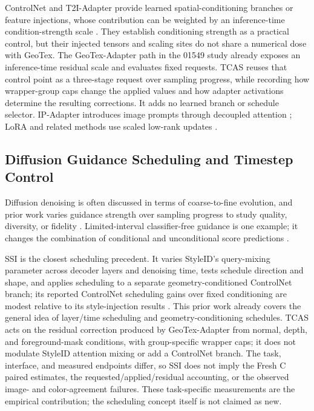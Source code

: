 \documentclass[times,twocolumn,final]{elsarticle}
\providecommand{\DIFadd}[1]{{\protect\color{blue} \sf #1}} %
\providecommand{\DIFaddbegin}{} %
\providecommand{\DIFaddend}{} %
\begin{document}
  \DIFaddbegin \DIFadd{ControlNet and }\DIFaddend T2I-Adapter   \DIFaddbegin \DIFadd{provide learned spatial-conditioning branches or feature injections, whose contribution can be weighted by an inference-time condition-strength scale \cite{mou2023t2iadapter,zhang2023controlnet}. They establish conditioning strength as a practical control, but their injected tensors and scaling sites do not share a numerical dose with GeoTex. The GeoTex-Adapter path in the 01549 study already exposes an inference-time residual scale and evaluates fixed requests. TCAS reuses that control point as a three-stage request over sampling progress, while recording how wrapper-group caps change the applied values and how adapter activations determine the resulting corrections. It adds no learned branch or schedule selector}\DIFaddend . IP-Adapter introduces image prompts through decoupled attention \cite{ye2023ipadapter}  \DIFaddbegin \DIFadd{; LoRA and related methods use scaled }\DIFaddend low-rank   updates \cite{hu2022lora,liu2024dora,zhang2023adalora}.
 
 

\subsection{Diffusion Guidance Scheduling and Timestep Control}
\label{subsec:guidance}

  \DIFaddbegin \DIFadd{Diffusion denoising is often discussed in terms of coarse-to-fine evolution, and prior work varies guidance strength over sampling progress to study quality, diversity, or fidelity \cite{ho2020ddpm,song2021ddim,ho2022cfg,castillo2023adaptive}. Limited-interval }\DIFaddend classifier-free   \DIFaddbegin \DIFadd{guidance is one example; it changes the combination of conditional and unconditional score predictions \cite{kynkanniemi2024limited}.
}\DIFaddend 

  \DIFaddbegin \DIFadd{SSI is the closest scheduling precedent. It varies StyleID's query-mixing parameter across decoder layers and denoising time, tests schedule direction and shape, and applies scheduling to a separate }\DIFaddend geometry-conditioned   \DIFaddbegin \DIFadd{ControlNet branch; its reported ControlNet scheduling gains over fixed conditioning are modest relative to its style-injection results \cite{kulkarni2026ssi}. This prior work already covers the general idea of layer/time scheduling and geometry-conditioning schedules. TCAS acts on the residual correction produced by GeoTex-Adapter from normal, depth, and foreground-mask conditions, with group-specific wrapper caps; it does not modulate StyleID attention mixing or add a ControlNet branch. The task, interface, and measured endpoints differ, so SSI does not imply the Fresh C paired estimates, the requested/applied/residual accounting, or the observed image- and color-agreement failures. These task-specific measurements are the empirical contribution; the scheduling concept itself is not claimed as new}\DIFaddend .
\end{document}
